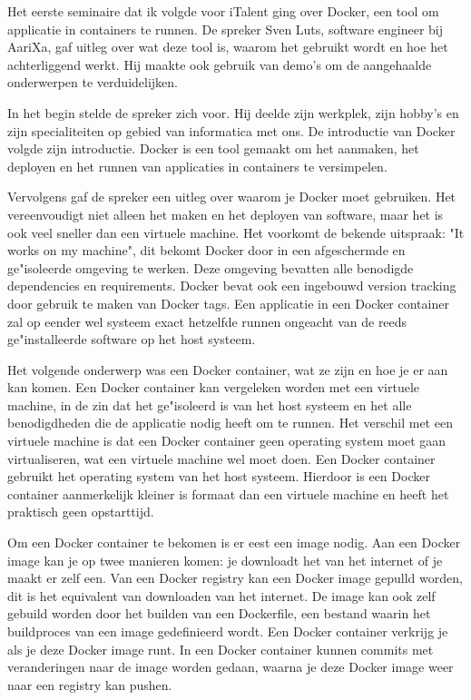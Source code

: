 
Het eerste seminaire dat ik volgde voor iTalent ging over Docker, een tool om applicatie in containers te runnen. De spreker Sven Luts, software engineer bij AariXa, gaf uitleg over wat deze tool is, waarom het gebruikt wordt en hoe het achterliggend werkt. Hij maakte ook gebruik van demo's om de aangehaalde onderwerpen te verduidelijken.

In het begin stelde de spreker zich voor. Hij deelde zijn werkplek, zijn hobby's en zijn specialiteiten op gebied van informatica met ons. De introductie van Docker volgde zijn introductie. Docker is een tool gemaakt om het aanmaken, het deployen en het runnen van applicaties in containers te versimpelen.

Vervolgens gaf de spreker een uitleg over waarom je Docker moet gebruiken. Het vereenvoudigt niet alleen het maken en het deployen van software, maar het is ook veel sneller dan een virtuele machine. Het voorkomt de bekende uitspraak: "It works on my machine", dit bekomt Docker door in een afgeschermde en ge"isoleerde omgeving te werken. Deze omgeving bevatten alle benodigde dependencies en requirements. Docker bevat ook een ingebouwd version tracking door gebruik te maken van Docker tags. Een applicatie in een Docker container zal op eender wel systeem exact hetzelfde runnen ongeacht van de reeds ge"installeerde software op het host systeem.

Het volgende onderwerp was een Docker container, wat ze zijn en hoe je er aan kan komen. Een Docker container kan vergeleken worden met een virtuele machine, in de zin dat het ge"isoleerd is van het host systeem en het alle benodigdheden die de applicatie nodig heeft om te runnen. Het verschil met een virtuele machine is dat een Docker container geen operating system moet gaan virtualiseren, wat een virtuele machine wel moet doen. Een Docker container gebruikt het operating system van het host systeem. Hierdoor is een Docker container aanmerkelijk kleiner is formaat dan een virtuele machine en heeft het praktisch geen opstarttijd.

Om een Docker container te bekomen is er eest een image nodig. Aan een Docker image kan je op twee manieren komen: je downloadt het van het internet of je maakt er zelf een. Van een Docker registry kan een Docker image gepulld worden, dit is het equivalent van downloaden van het internet. De image kan ook zelf gebuild worden door het builden van een Dockerfile, een bestand waarin het buildproces van een image gedefinieerd wordt. Een Docker container verkrijg je als je deze Docker image runt. In een Docker container kunnen commits met veranderingen naar de image worden gedaan, waarna je deze Docker image weer naar een registry kan pushen.


